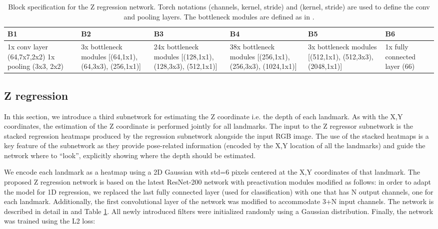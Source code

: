 \documentclass[runningheads]{llncs}
\begin{document}
 \begin{table}
	\begin{center}
		\caption{Block specification for the Z regression network. Torch notations (channels, kernel, stride) and (kernel, stride) are used to define the conv and pooling layers. The bottleneck modules are defined as in \cite{he2016identity}.}
        \scriptsize
		\label{table:DetContent}
		\begin{tabular}{| *6{>{\raggedright\arraybackslash}p{1.7cm}|}}
        \hline
			B1 & B2 & B3 & B4 & B5 & B6    \\ \hline
		 1x conv layer (64,7x7,2x2) 1x pooling (3x3, 2x2)   & 3x bottleneck modules [(64,1x1), (64,3x3), (256,1x1)]   & 24x bottleneck modules [(128,1x1), (128,3x3), (512,1x1)]  & 38x bottleneck modules [(256,1x1), (256,3x3), (1024,1x1)] & 3x bottleneck modules [(512,1x1), (512,3x3), (2048,1x1)] &  1x fully connected layer (66)  \\ \hline
		\end{tabular}
	\end{center}
\end{table}
\setlength{\tabcolsep}{1.4pt}

\subsection{Z regression}\label{ssec:method1d}
In this section, we introduce a third subnetwork for estimating the Z coordinate i.e. the depth of each landmark. As with the X,Y coordinates, the estimation of the Z coordinate is performed jointly for all landmarks. The input to the Z regressor subnetwork is the stacked regression heatmaps produced by the regression subnetwork alongside the input RGB image. The use of the stacked heatmaps is a key feature of the subnetwork as they provide pose-related information (encoded by the X,Y location of all the landmarks) and guide the network where to ``look'', explicitly showing where the depth should be estimated.

We encode each landmark as a heatmap using a 2D Gaussian with std=6 pixels centered at the X,Y coordinates of that landmark. The proposed Z regression network is based on the latest ResNet-200 network with preactivation modules \cite{he2016identity} modified as follows: in order to adapt the model for 1D regression, we replaced the last fully connected layer (used for classification) with one that has N output channels, one for each landmark. Additionally, the first convolutional layer of the network was modified to accommodate 3+N input channels. The network is described in detail in  and Table \ref{table:DetContent}. All newly introduced filters were initialized randomly using a Gaussian distribution. Finally, the network was trained using the L2 loss:
\end{document}
